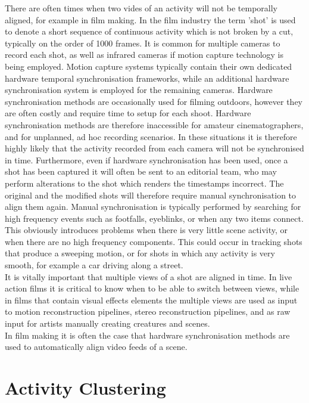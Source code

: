 There are often times when two vides of an activity will not be temporally aligned, for example in film making. In the film industry the term 'shot' is used to denote a short sequence of continuous activity which is not broken by a cut, typically on the order of 1000 frames. It is common for multiple cameras to record each shot, as well as infrared cameras if motion capture technology is being employed. Motion capture systems typically contain their own dedicated hardware temporal synchronisation frameworks, while an additional hardware synchronisation system is employed for the remaining cameras. Hardware synchronisation methods are occasionally used for filming outdoors, however they are often costly and require time to setup for each shoot. Hardware synchronisation methods are therefore inaccessible for amateur cinematographers, and for unplanned, ad hoc recording scenarios. In these situations it is therefore highly likely that the activity recorded from each camera will not be synchronised in time. Furthermore, even if hardware synchronisation has been used, once a shot has been captured it will often be sent to an editorial team, who may perform alterations to the shot which renders the timestamps incorrect. The original and the modified shots will therefore require manual synchronisation to align them again. Manual synchronisation is typically performed by searching for high frequency events such as footfalls, eyeblinks, or when any two items connect. This obviously introduces problems when there is very little scene activity, or when there are no high frequency components. This could occur in tracking shots that produce a sweeping motion, or for shots in which any activity is very smooth, for example a car driving along a street. \\

It is vitally important that multiple views of a shot are aligned in time. In live action films it is critical to know when to be able to switch between views, while in films that contain visual effects elements the multiple views are used as input to motion reconstruction pipelines, stereo reconstruction pipelines, and as raw input for artists manually creating creatures and scenes. \\

In film making it is often the case that hardware synchronisation methods are used to automatically align video feeds of a scene. \\

\section{Activity Clustering}
